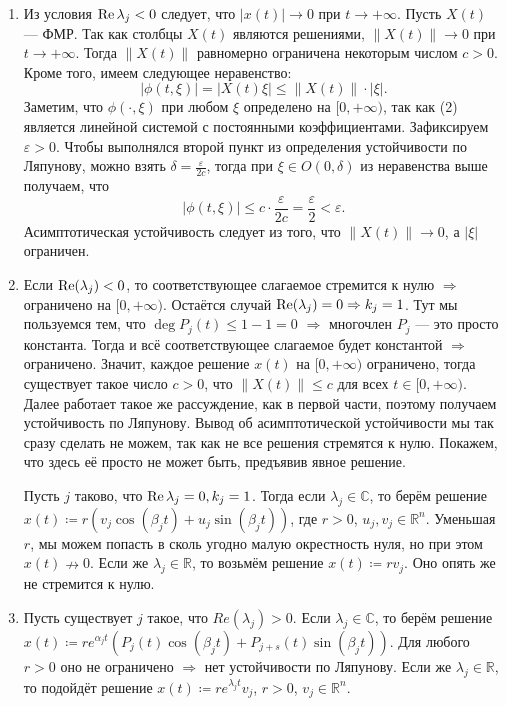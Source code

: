 \begin{enumerate}
\item Из условия $\operatorname{Re} \lambda_j < 0$ следует, что $|x(t)| \to 0$ при $t \to +\infty$. Пусть $X(t)$ --- ФМР. Так как столбцы $X(t)$ являются решениями, $\|X(t)\| \to 0$ при $t \to +\infty$.
Тогда $\|X(t)\|$ равномерно ограничена некоторым числом $c > 0$. Кроме того, имеем следующее неравенство:
\[
    |\phi(t, \xi)| = |X(t) \xi| \le \| X(t) \| \cdot |\xi|.
\]
Заметим, что $\phi(\cdot, \xi)$ при любом $\xi$ определено на $[0, +\infty)$, так как (2) является линейной системой с постоянными коэффициентами. Зафиксируем $\varepsilon > 0$. Чтобы выполнялся второй пункт из определения устойчивости по Ляпунову, можно взять $\delta = \frac{\varepsilon}{2c}$, тогда
при $\xi \in O(0, \delta)$ из неравенства выше получаем, что 
\[
    |\phi(t, \xi)| \leq c \cdot \frac{\varepsilon}{2c} = \frac{\varepsilon}{2} < \varepsilon.
\]
Асимптотическая устойчивость следует из того, что $\|X(t)\| \to 0$, а $|\xi|$ ограничен.

\item Если $\operatorname{Re}(\lambda_j) < 0$, то соответствующее слагаемое стремится к нулю $\Rightarrow$ ограничено на $[0, +\infty)$.
Остаётся случай $\operatorname{Re}(\lambda_j) = 0 \Rightarrow k_j = 1$. Тут мы пользуемся тем, что $\deg P_j(t) \le 1 - 1 = 0$ $\Rightarrow$ многочлен $P_j$ --- это просто константа. Тогда и всё соответствующее слагаемое будет константой $\Rightarrow$ ограничено.
Значит, каждое решение $x(t)$ на $[0, +\infty)$ ограничено, тогда существует такое число $c > 0$, что $\|X(t)\| \le c$ для всех $t \in [0, +\infty)$. Далее работает такое же рассуждение, как в первой части, поэтому получаем устойчивость по Ляпунову. Вывод об асимптотической устойчивости мы так сразу сделать не можем, так как не все решения стремятся к нулю. Покажем, что здесь её просто не может быть, предъявив явное решение.

Пусть $j$ таково, что $\operatorname{Re} \lambda_j = 0, k_j = 1$. Тогда если $\lambda_j \in \mathbb C$, то берём решение $x(t) \coloneq r(v_j \cos(\beta_j t) + u_j\sin(\beta_j t))$, где $r > 0$, $u_j, v_j \in \mathbb R^n$. Уменьшая $r$, мы можем попасть в сколь угодно малую окрестность нуля, но при этом $x(t) \nrightarrow 0$. Если же $\lambda_j \in \mathbb R$, то возьмём решение $x(t) \coloneq rv_j$. Оно опять же не стремится к нулю.

\item Пусть существует $j$ такое, что $Re(\lambda_j) > 0$. Если $\lambda_j \in \mathbb C$, то берём решение $x(t) \coloneq re^{\alpha_j t} (P_j(t)\cos(\beta_j t) + P_{j+s}(t)\sin(\beta_j t))$. Для любого $r > 0$ оно не ограничено $\Rightarrow$ нет устойчивости по Ляпунову.
Если же $\lambda_j \in \mathbb R$, то подойдёт решение $x(t) \coloneq r e^{\lambda_j t}v_j$, $r > 0$, $v_j \in \mathbb R^n$.


\end{enumerate}
